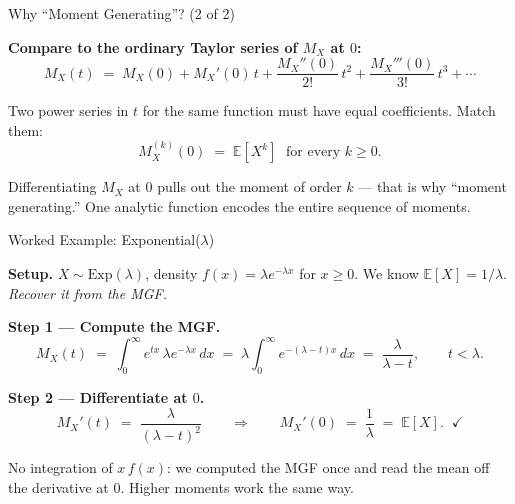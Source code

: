 \documentclass[aspectratio=169, handout, t]{beamer}
\numberwithin{equation}{section}
\begin{document}

\begin{frame}{Why ``Moment Generating''? (2 of 2)}

\textbf{Compare to the ordinary Taylor series of $M_X$ at $0$:}
\[
M_X(t) \;=\; M_X(0) + M_X'(0)\,t + \frac{M_X''(0)}{2!}\,t^2 + \frac{M_X'''(0)}{3!}\,t^3 + \cdots
\]

\pause

\medskip

Two power series in $t$ for the same function must have equal coefficients. Match them:
\[
\boxed{\;M_X^{(k)}(0) \;=\; \mathbb{E}[X^k]\; \text{ for every } k \geq 0.\;}
\]

\pause

\medskip

Differentiating $M_X$ at $0$ pulls out the moment of order $k$ --- that is why ``moment generating.'' One analytic function encodes the entire sequence of moments.

\end{frame}


\begin{frame}{Worked Example: Exponential($\lambda$)}

\textbf{Setup.} $X \sim \text{Exp}(\lambda)$, density $f(x) = \lambda e^{-\lambda x}$ for $x \geq 0$. We know $\mathbb{E}[X] = 1/\lambda$. \emph{Recover it from the MGF.}

\pause

\medskip

\textbf{Step 1 --- Compute the MGF.}
\[
M_X(t) \;=\; \int_0^\infty e^{tx}\,\lambda e^{-\lambda x}\,dx
\;=\; \lambda\int_0^\infty e^{-(\lambda-t)x}\,dx
\;=\; \frac{\lambda}{\lambda - t},\qquad t < \lambda.
\]

\pause

\medskip

\textbf{Step 2 --- Differentiate at $0$.}
\[
M_X'(t) \;=\; \frac{\lambda}{(\lambda-t)^2}
\qquad\Longrightarrow\qquad
M_X'(0) \;=\; \frac{1}{\lambda} \;=\; \mathbb{E}[X]. \;\;\checkmark
\]

\pause

\medskip

No integration of $x\,f(x)$: we computed the MGF once and read the mean off the derivative at $0$. Higher moments work the same way.

\end{frame}
\end{document}
